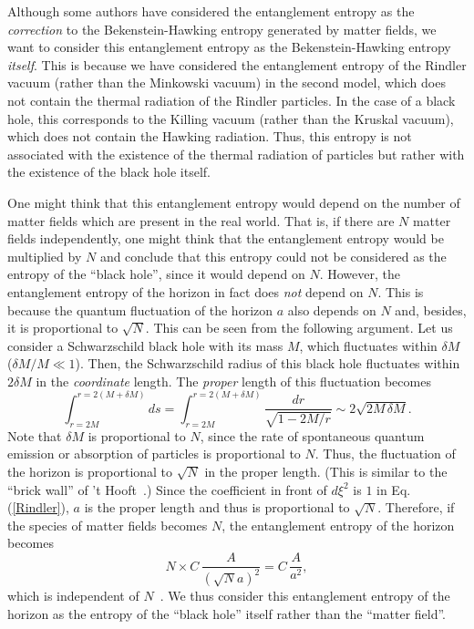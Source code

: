 Although some authors have considered
the entanglement entropy as the {\em correction} to
the Bekenstein-Hawking entropy generated by matter fields,
we want to consider this entanglement entropy
as the Bekenstein-Hawking entropy {\em itself}.
This is because we have considered the entanglement entropy
of the Rindler vacuum (rather than the Minkowski vacuum)
in the second model, which does not contain the thermal radiation
of the Rindler particles.
In the case of a black hole, 
this corresponds to the Killing vacuum
(rather than the Kruskal vacuum),
which does not contain the Hawking radiation.
Thus, this entropy is not associated with the existence
of the thermal radiation of particles
but rather with the existence of the black hole itself.

One might think that this entanglement entropy
would depend on the number of matter fields which are present
in the real world.
That is, if there are $N$ matter fields independently,
one might think that
the entanglement entropy would be multiplied by $N$
and conclude that this entropy
could not be considered as the entropy of
the ``black hole'', since it would depend on $N$.
However, the entanglement entropy of the horizon
in fact does {\em not} depend on $N$.
This is because the quantum fluctuation of the horizon $a$
also depends on $N$ and, besides,
it is proportional to $\sqrt{N}$.
This can be seen from the following argument.
Let us consider a Schwarzschild black hole with its mass $M$,
which fluctuates within $\delta M$ ($\delta M/M\ll 1$).
Then, the Schwarzschild radius of this black hole fluctuates
within $2\delta M$ in the {\em coordinate} length.
The {\em proper} length of this fluctuation becomes
\begin{equation}
\int^{r=2(M+\delta M)}_{r=2M}ds=\int^{r=2(M+\delta M)}_{r=2M}
\frac{dr}{\sqrt{1-2M/r}} \sim 2\sqrt{2M\,\delta M}.
\end{equation}
Note that $\delta M$ is proportional to $N$,
since the rate of spontaneous quantum emission or
absorption of particles is proportional to $N$.
Thus, the fluctuation of the horizon is proportional to
$\sqrt{N}$ in the proper length.
(This is similar to the ``brick wall''
of 't Hooft~\cite{tHooft85}.)
Since the coefficient in front of $d\xi^2$ is $1$ in
Eq.(\ref{Rindler}), $a$ is the proper length and thus
is proportional to $\sqrt{N}$.
Therefore,
if the species of matter fields becomes $N$,
the entanglement entropy of the horizon becomes
\begin{equation}
N\times
C\,\frac{A}{(\sqrt{N}a)^2}=C\,\frac{A}{a^2},
\end{equation}
which is independent of $N$~\cite{FroNov93}.
We thus consider this entanglement entropy of the horizon
as the entropy of the ``black hole'' itself rather than
the ``matter field''.


